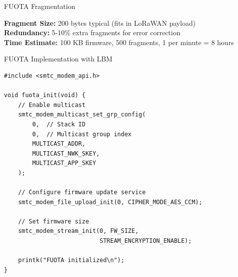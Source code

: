 \documentclass{beamer}
\begin{document}
\begin{frame}{FUOTA Fragmentation}
\begin{center}
\end{center}

\vspace{0.3cm}

\textbf{Fragment Size:} 200 bytes typical (fits in LoRaWAN payload)\\
\textbf{Redundancy:} 5-10\% extra fragments for error correction\\
\textbf{Time Estimate:} 100 KB firmware, 500 fragments, 1 per minute = 8 hours
\end{frame}

\begin{frame}[fragile]{FUOTA Implementation with LBM}
\begin{lstlisting}[caption={Enable FUOTA in LBM}]
#include <smtc_modem_api.h>

void fuota_init(void) {
    // Enable multicast
    smtc_modem_multicast_set_grp_config(
        0,  // Stack ID
        0,  // Multicast group index
        MULTICAST_ADDR,
        MULTICAST_NWK_SKEY,
        MULTICAST_APP_SKEY
    );

    // Configure firmware update service
    smtc_modem_file_upload_init(0, CIPHER_MODE_AES_CCM);

    // Set firmware size
    smtc_modem_stream_init(0, FW_SIZE,
                           STREAM_ENCRYPTION_ENABLE);

    printk("FUOTA initialized\n");
}
\end{lstlisting}
\end{frame}
\end{document}
